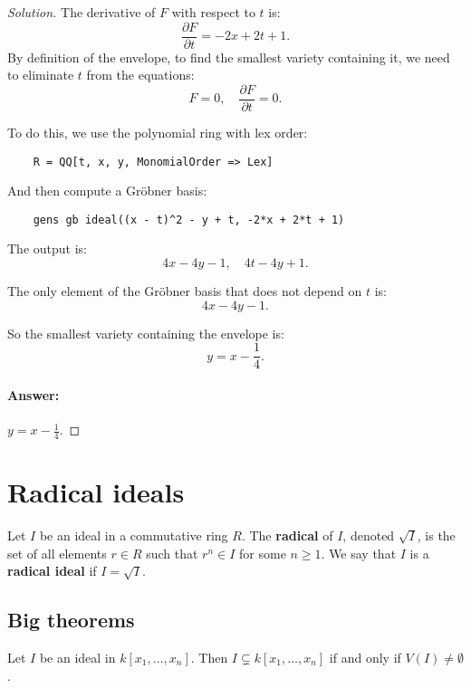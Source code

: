\documentclass[12pt]{article}
\newenvironment{solution}
    {\renewcommand{\qedsymbol}{}\begin{proof}[Solution]}
    {\end{proof}}
\begin{document}
\begin{solution}
	The derivative of \(F\) with respect to \(t\) is:
	\[
		\frac{\partial F}{\partial t} = -2x + 2t + 1.
	\]
	By definition of the envelope, to find the smallest variety containing it, we need to eliminate \(t\) from the equations:
	\[
		F = 0, \quad \frac{\partial F}{\partial t} = 0.
	\]

	To do this, we use the polynomial ring with lex order:
	\begin{verbatim}
    R = QQ[t, x, y, MonomialOrder => Lex]
    \end{verbatim}

	And then compute a Gr\"obner basis:
	\begin{verbatim}
    gens gb ideal((x - t)^2 - y + t, -2*x + 2*t + 1)
    \end{verbatim}

	The output is:
	\[
		4x - 4y - 1, \quad 4t - 4y + 1.
	\]

	The only element of the Gr\"obner basis that does not depend on \(t\) is:
	\[
		4x - 4y - 1.
	\]

	So the smallest variety containing the envelope is:
	\[
		y = x - \frac{1}{4}.
	\]

	\paragraph{Answer:} \(y = x - \frac{1}{4}\).
\end{solution}



\section{Radical ideals}
\begin{definition}
	Let \( I \) be an ideal in a commutative ring \( R \). The \textbf{radical} of \( I \), denoted \( \sqrt{I} \), is the set of all elements \( r \in R \) such that \( r^n \in I \) for some \( n \geq 1 \). We say that \( I \) is a \textbf{radical ideal} if \( I = \sqrt{I} \).
\end{definition}
\subsection{Big theorems}
\begin{theorem}
	Let $I$ be an ideal in $k[x_1, \ldots, x_n]$. Then $I \subsetneq k[x_1, \ldots, x_n]$ if and only if $V(I) \neq \emptyset$.
\end{theorem}
\end{document}
